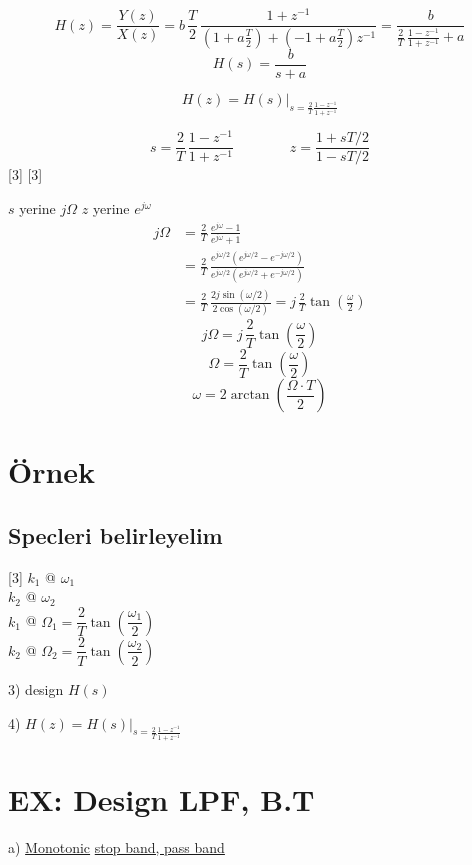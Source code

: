 \documentclass[11pt,a4paper]{article}
\begin{document}
\[ H(z) = \frac{Y(z)}{X(z)} = b\,\frac{T}{2}\,\frac{1+z^{-1}}{\left(1+a\frac{T}{2}\right) + \left(-1+a\frac{T}{2}\right)z^{-1}} = \frac{b}{\frac{2}{T}\,\frac{1-z^{-1}}{1+z^{-1}} + a} \]
\[ H(s) = \frac{b}{s+a} \]

\[ H(z) = H(s)\Big|_{s=\frac{2}{T}\frac{1-z^{-1}}{1+z^{-1}}} \]

\[ s = \frac{2}{T}\,\frac{1-z^{-1}}{1+z^{-1}} \qquad\qquad z = \frac{1+sT/2}{1-sT/2} \]
[3]
[3]

$s$ yerine $j\Omega$ \qquad $z$ yerine $e^{j\omega}$
\begin{align*}
j\Omega &= \frac{2}{T}\,\frac{e^{j\omega}-1}{e^{j\omega}+1} \\
&= \frac{2}{T}\,\frac{e^{j\omega/2}\left(e^{j\omega/2}-e^{-j\omega/2}\right)}{e^{j\omega/2}\left(e^{j\omega/2}+e^{-j\omega/2}\right)} \\
&= \frac{2}{T}\,\frac{2j\sin(\omega/2)}{2\cos(\omega/2)} = j\,\frac{2}{T}\tan\!\left(\frac{\omega}{2}\right)
\end{align*}
\[ j\Omega = j\,\frac{2}{T}\tan\!\left(\frac{\omega}{2}\right) \]
\[ \Omega = \frac{2}{T}\tan\!\left(\frac{\omega}{2}\right) \]
\[ \omega = 2\arctan\!\left(\frac{\Omega\cdot T}{2}\right) \]

\section{Örnek}
\subsection{Specleri belirleyelim}
[3]
\noindent $k_1$ @ $\omega_1$ \\
$k_2$ @ $\omega_2$ \\
$k_1$ @ $\Omega_1 = \dfrac{2}{T}\tan\!\left(\dfrac{\omega_1}{2}\right)$ \\
$k_2$ @ $\Omega_2 = \dfrac{2}{T}\tan\!\left(\dfrac{\omega_2}{2}\right)$

3) design $H(s)$

4) $H(z) = H(s)\Big|_{s=\frac{2}{T}\frac{1-z^{-1}}{1+z^{-1}}}$

\section{EX: Design LPF, B.T}

a) \underline{Monotonic} \underline{stop band, pass band}
\end{document}
